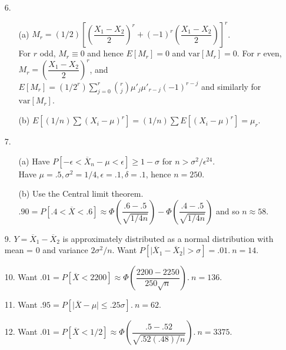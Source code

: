 \begin{enumerate}
	\item[6.]  \begin{enumerate}
		\item[(a)] $M_r = (1/2)\left[\left(\dfrac{X_1-X_2}{2}\right)^r + (-1)^r\left(\dfrac{X_1-X_2}{2}\right)\right]^r$. \\
		For $r$ odd, $M_r \equiv 0$ and hence $E[M_r]=0$ and $\mbox{var}[M_r]=0$. For $r$ even, $M_r = \left(\dfrac{X_1-X_2}{2}\right)^r$, and $E[M_r] = (1/2^r)\sum\limits_{j=0}^r{r\choose j}\mu'_j\mu'_{r-j}(-1)^{r-j}$ and similarly for $\mbox{var}[M_r]$.
		\item[(b)] $E[(1/n)\sum(X_i-\mu)^r] = (1/n)\sum E[(X_i-\mu)^r] = \mu_r$.
	\end{enumerate}

	\item[7.]  \begin{enumerate}
		\item[(a)] Have $P[-\epsilon < \overline{X}_n - \mu < \epsilon] \ge 1 - \sigma$ for $n > \sigma^2/\epsilon^24.$ \\
		Have $\mu = .5, \sigma^2=1/4, \epsilon=.1, \delta=.1$, hence $n=250$.
		\item[(b)] Use the Central limit theorem. \\
		$.90 = P[.4 < \overline{X}<.6] \approx \Phi\left(\dfrac{.6-.5}{\sqrt{1/4n}}\right) - \Phi\left(\dfrac{.4-.5}{\sqrt{1/4n}}\right)$ and so $n \approx 58$. 
	\end{enumerate}

	\newpage
	\item[9.] $Y=\overline{X}_1-\overline{X}_2$ is approximately distributed as a normal distribution with mean = 0 and variance $2\sigma^2/n$. Want $P[\vert\overline{X}_1-\overline{X}_2\vert>\sigma] = .01.\ n = 14$.
	
	\item[10.] Want $.01 = P[\overline{X}<2200] \approx \Phi\left(\dfrac{2200-2250}{250\sqrt{n}}\right)\!.\ n =136$.
	
	\item[11.] Want $.95 = P[\vert\overline{X}-\mu\vert\le .25\sigma].\ n =62$.
		
	\item[12.] Want $.01 = P[\overline{X}<1/2]\approx \Phi\left(\dfrac{.5-.52}{\sqrt{.52(.48)/n}}\right)\!.\ n = 3375$.
	

\end{enumerate}
